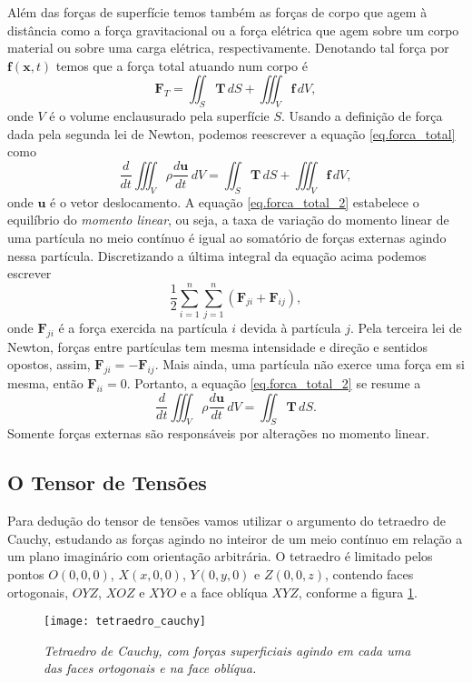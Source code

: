 Al\'em das for\c{c}as de superf\'icie temos tamb\'em as for\c{c}as de corpo que agem \`a dist\^ancia como a for\c{c}a gravitacional ou a for\c{c}a el\'etrica que agem sobre um corpo material ou sobre uma carga el\'etrica, respectivamente. Denotando tal for\c{c}a por $\mathbf{f}(\mathbf{x},t)$ temos que a for\c{c}a total atuando num corpo \'e
\begin{equation}\label{eq.forca_total}
\mathbf{F}_T=\iint_S\mathbf{T}\,dS+\iiint_V\mathbf{f}\,dV,
\end{equation}
onde $V$ \'e o volume enclausurado pela superf\'icie $S$. Usando a defini\c{c}\~ao de for\c{c}a dada pela segunda lei de Newton, podemos reescrever a equa\c{c}\~ao \ref{eq.forca_total} como
\begin{equation}\label{eq.forca_total_2}
\frac{d}{dt}\iiint_V\rho\frac{d\mathbf{u}}{dt}\,dV=\iint_S\mathbf{T}\,dS+\iiint_V\mathbf{f}\,dV,
\end{equation}
onde $\mathbf{u}$ \'e o vetor deslocamento. A equa\c{c}\~ao \ref{eq.forca_total_2} estabelece o equil\'ibrio do \textit{momento linear}, ou seja, a taxa de varia\c{c}\~ao do momento linear de uma part\'icula no meio cont\'inuo \'e igual ao somat\'orio de for\c{c}as externas agindo nessa part\'icula. Discretizando a \'ultima integral da equa\c{c}\~ao acima podemos escrever
\begin{equation*}
\frac{1}{2}\sum_{i=1}^n\sum_{j=1}^n(\mathbf{F}_{ji}+\mathbf{F}_{ij}),
\end{equation*}
onde $\mathbf{F}_{ji}$ \'e a for\c{c}a exercida na part\'icula $i$ devida \`a part\'icula $j$. Pela terceira lei de Newton, for\c{c}as entre part\'iculas tem mesma intensidade e dire\c{c}\~ao e sentidos opostos, assim, $\mathbf{F}_{ji}=-\mathbf{F}_{ij}$. Mais ainda, uma part\'icula n\~ao exerce uma for\c{c}a em si mesma, ent\~ao $\mathbf{F}_{ii}=0$. Portanto, a equa\c{c}\~ao \ref{eq.forca_total_2} se resume a
\begin{equation*}
\frac{d}{dt}\iiint_V\rho\frac{d\mathbf{u}}{dt}\,dV=\iint_S\mathbf{T}\,dS.
\end{equation*}
Somente for\c{c}as externas s\~ao respons\'aveis por altera\c{c}\~oes no momento linear.

\subsection{O Tensor de Tens\~oes}\label{sec.tensor_tensoes}

Para dedu\c{c}\~ao do tensor de tens\~oes vamos utilizar o argumento do tetraedro de Cauchy, estudando as for\c{c}as agindo no inteiror de um meio cont\'inuo em rela\c{c}\~ao a um plano imagin\'ario com orienta\c{c}\~ao arbitr\'aria. O tetraedro \'e limitado pelos pontos $O(0,0,0)$, $X(x,0,0)$, $Y(0,y,0)$ e $Z(0,0,z)$, contendo faces ortogonais, $OYZ$, $XOZ$ e $XYO$ e a face obl\'iqua $XYZ$, conforme a figura \ref{fig.tetraedro}.
\begin{figure}
\centering
\texttt{[image: tetraedro\_cauchy]}
\caption{\textit{Tetraedro de Cauchy, com for\c{c}as superficiais agindo em cada uma das faces ortogonais e na face obl\'iqua.}}
\label{fig.tetraedro}
\end{figure}

